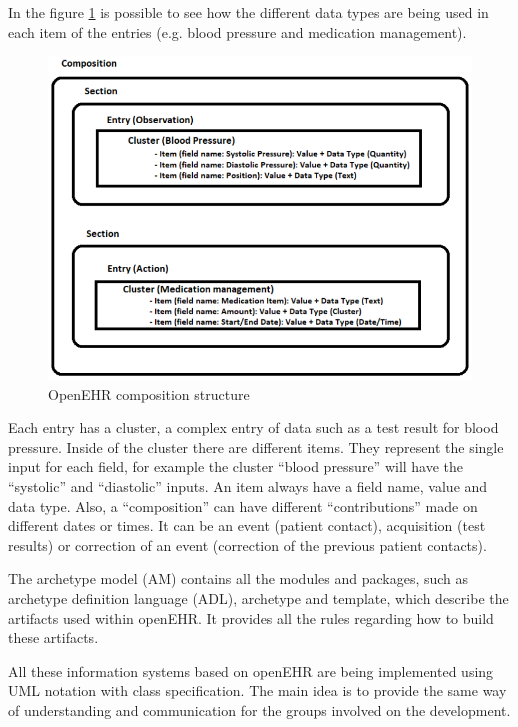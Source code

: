 \documentclass[mim_thesis.tex]{subfiles}
\begin{document}
In the figure \ref{fig:openehr_comp_struct} is possible to see how the different data types are being used in each item of the entries (e.g. blood pressure and medication management). 

\begin{figure}[H]
	\centering
    \includegraphics[width=1\textwidth]{img/openehr_comp_struct.PNG}
	\caption{OpenEHR composition structure}
	\label{fig:openehr_comp_struct}
\end{figure}

Each entry has a cluster, a complex entry of data such as a test result for blood pressure. Inside of the cluster there are different items. They represent the single input for each field, for example the cluster “blood pressure” will have the “systolic” and “diastolic” inputs. An item always have a field name, value and data type. Also, a “composition” can have different “contributions” made on different dates or times. It can be an event (patient contact), acquisition (test results) or correction of an event (correction of the previous patient contacts).

The archetype model (AM) contains all the modules and packages, such as archetype definition language (ADL), archetype and template, which describe the artifacts used within openEHR. It provides all the rules regarding how to build these artifacts. 

All these information systems based on openEHR are being implemented using UML notation with class specification. The main idea is to provide the same way of understanding and communication for the groups involved on the development. 
\end{document}
